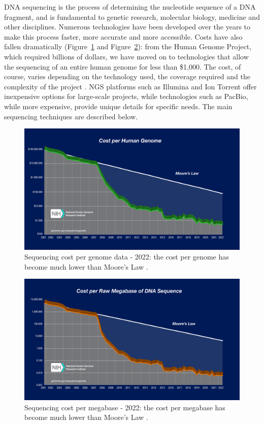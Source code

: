 \acs{DNA} sequencing is the process of determining the nucleotide sequence of a \acs{DNA} fragment, and is fundamental to genetic research, molecular biology, medicine and other disciplines. Numerous technologies have been developed over the years to make this process faster, more accurate and more accessible. Costs have also fallen dramatically (Figure~\ref{fig:sequencing-cost-per-human-genome} and Figure~\ref{fig:sequencing-cost-per-mb}): from the Human Genome Project, which required billions of dollars, we have moved on to technologies that allow the sequencing of an entire human genome for less than \$1,000. The cost, of course, varies depending on the technology used, the coverage required and the complexity of the project \cite{nhgri2023cost}. \acs{NGS} platforms such as Illumina and Ion Torrent offer inexpensive options for large-scale projects, while technologies such as \acs{PacBio}, while more expensive, provide unique details for specific needs. The main sequencing techniques are described below.

\begin{figure}[!ht]
	\centering
	\includegraphics[width=0.85\linewidth]{images/2022_Sequencing_cost_per_Human_Genome}
	\caption[Sequencing cost per genome data]{Sequencing cost per genome data - 2022: the cost per genome has become much lower than Moore’s Law \cite{nhgri2023cost}.}
	\label{fig:sequencing-cost-per-human-genome}
\end{figure}

\begin{figure}[!ht]
	\centering
	\includegraphics[width=0.85\linewidth]{images/2022_Sequencing_cost_per_Mb}
	\caption[Sequencing cost per megabase]{Sequencing cost per megabase - 2022: the cost per megabase has become much lower than Moore’s Law \cite{nhgri2023cost}.}
	\label{fig:sequencing-cost-per-mb}
\end{figure}



